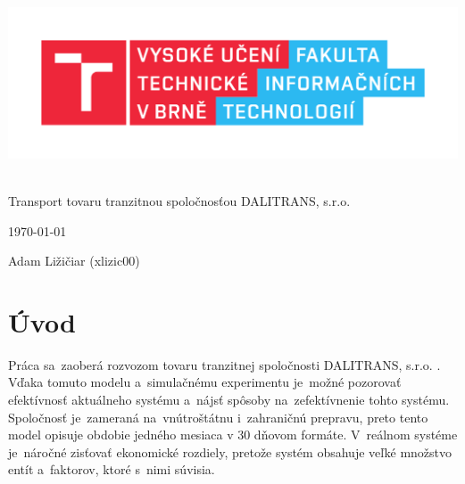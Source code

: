 \documentclass[a4paper, 11pt]{article}
\begin{document}
	\begin{titlepage}
		\begin{center}
			\includegraphics[width=0.77\linewidth]{resources/logo_FIT.pdf} \\


			 \\
			\LARGE{Transport tovaru tranzitnou spoločnosťou DALITRANS, s.r.o.} \\
		\end{center}

		\begin{minipage}[b]{0.4 \textwidth}
			\raggedright
			{\Large \today}
		\end{minipage}
		\hfill
		\begin{minipage}[b]{0.6 \textwidth}
			\raggedleft
			\Large
			Adam Ližičiar (xlizic00)\\
		\end{minipage}		
	\end{titlepage}

	\setcounter{page}{1}
	\tableofcontents
	\clearpage

	\setcounter{page}{1}
	
	\section{Úvod}
	Práca sa~zaoberá rozvozom tovaru tranzitnej spoločnosti DALITRANS, s.r.o. .
    Vďaka tomuto modelu a~simulačnému experimentu je~možné pozorovať
    efektívnosť aktuálneho systému a~nájsť spôsoby na~zefektívnenie
    tohto systému. Spoločnosť je~zameraná na~vnútroštátnu i~zahraničnú prepravu,
    preto tento model opisuje obdobie jedného mesiaca v 30 dňovom formáte. \newline
    V~reálnom systéme je~náročné zisťovať ekonomické rozdiely, pretože
    systém obsahuje veľké množstvo entít a~faktorov, ktoré s~nimi súvisia.
\end{document}
